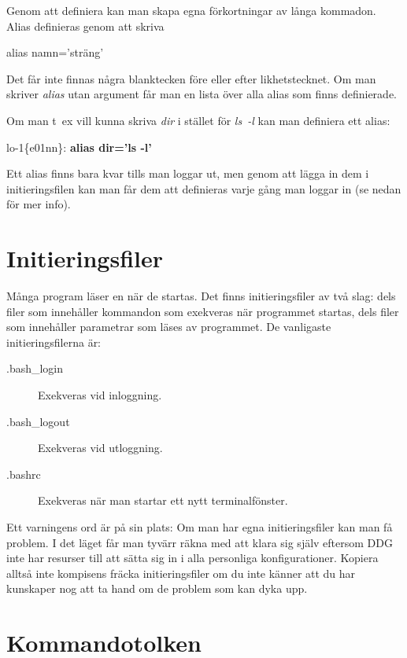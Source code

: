 \documentclass[a4paper,twocolumn]{book}
\begin{document}
Genom att definiera  kan man skapa egna förkortningar
av långa kommadon. Alias definieras genom att skriva
\begin{ttquote}
  alias namn='sträng'
\end{ttquote}
Det får inte finnas några blanktecken före eller efter
likhetstecknet. Om man skriver \emph{alias} utan argument får man en
lista över alla alias som finns definierade.

Om man t~ex vill kunna skriva \emph{dir} i stället för \emph{ls~-l}
kan man definiera ett alias:
\begin{example}
  lo-1\{e01nn\}: \textbf{alias dir='ls -l'}
\end{example}

Ett alias finns bara kvar tills man loggar ut,
men genom att lägga in dem i initieringsfilen  kan man
får dem att definieras varje gång man loggar in (se nedan för
mer info).

\section{Initieringsfiler}

Många program läser en  när de startas. Det
finns initieringsfiler av två slag: dels filer som innehåller
kommandon som exekveras när programmet startas, dels filer som
innehåller parametrar som läses av programmet. De vanligaste
initieringsfilerna är:
\begin{description}
\item[.bash\_login] Exekveras vid inloggning.
\item[.bash\_logout] Exekveras vid utloggning.
\item[.bashrc] Exekveras när man startar ett nytt
  terminalfönster.
\end{description}

Ett varningens ord är på sin plats: Om man har egna initieringsfiler kan man
få problem. I det läget får man tyvärr räkna med att klara sig själv eftersom
DDG inte har resurser till att sätta sig in i alla personliga konfigurationer.
Kopiera alltså inte kompisens fräcka initieringsfiler om du inte känner att du
har kunskaper nog att ta hand om de problem som kan dyka upp.

\section{Kommandotolken}
\end{document}
